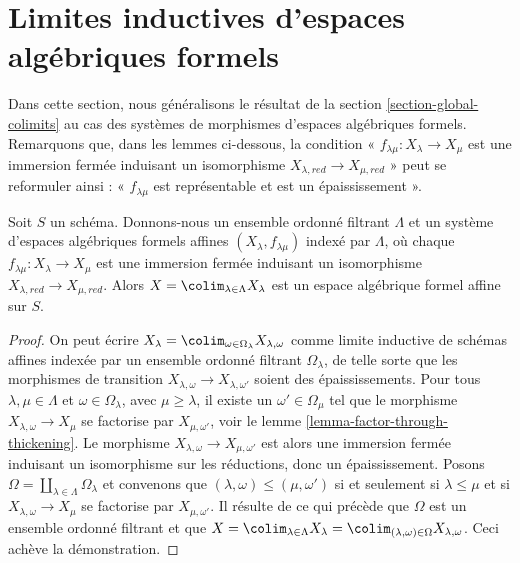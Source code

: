 \section{Limites inductives d'espaces algébriques formels}
\label{section-colimits-of-formal}

\noindent
Dans cette section, nous généralisons le résultat de la
section \ref{section-global-colimits}
au cas des systèmes de morphismes d'espaces algébriques formels.
Remarquons que, dans les lemmes ci-dessous, la condition
« $f_{\lambda \mu} : X_\lambda \to X_\mu$ est une immersion fermée
induisant un isomorphisme $X_{\lambda, red} \to X_{\mu, red}$ »
peut se reformuler ainsi :
« $f_{\lambda \mu}$ est représentable et est un épaississement ».

\begin{lemma}
\label{lemma-colimit-affine-formal}
Soit $S$ un schéma. Donnons-nous un ensemble ordonné filtrant
$\Lambda$ et un système d'espaces algébriques formels affines
$(X_\lambda, f_{\lambda \mu})$ indexé par $\Lambda$, où chaque
$f_{\lambda \mu} : X_\lambda \to X_\mu$ est une immersion fermée
induisant un isomorphisme $X_{\lambda, red} \to X_{\mu, red}$.
Alors $X = \colim_{\lambda \in \Lambda} X_\lambda$
est un espace algébrique formel affine sur $S$.
\end{lemma}

\begin{proof}
On peut écrire
$X_\lambda = \colim_{\omega \in \Omega_\lambda} X_{\lambda, \omega}$
comme limite inductive de schémas affines indexée par un ensemble ordonné filtrant
$\Omega_\lambda$, de telle sorte que les morphismes de transition
$X_{\lambda, \omega} \to X_{\lambda, \omega'}$
soient des épaississements. Pour tous $\lambda, \mu \in \Lambda$
et $\omega \in \Omega_\lambda$, avec $\mu \geq \lambda$,
il existe un $\omega' \in \Omega_\mu$ tel que le morphisme
$X_{\lambda, \omega} \to X_\mu$ se factorise par $X_{\mu, \omega'}$, voir le
lemme \ref{lemma-factor-through-thickening}. Le
morphisme $X_{\lambda, \omega} \to X_{\mu, \omega'}$
est alors une immersion fermée induisant un isomorphisme sur les réductions,
donc un épaississement. Posons
$\Omega = \coprod_{\lambda \in \Lambda} \Omega_\lambda$
et convenons que $(\lambda, \omega) \leq (\mu, \omega')$ si et seulement si
$\lambda \leq \mu$ et si $X_{\lambda, \omega} \to X_\mu$ se factorise par
$X_{\mu, \omega'}$. Il résulte de ce qui précède que
$\Omega$ est un ensemble ordonné filtrant et que
$X = \colim_{\lambda \in \Lambda} X_\lambda =
\colim_{(\lambda, \omega) \in \Omega} X_{\lambda, \omega}$.
Ceci achève la démonstration.
\end{proof}

